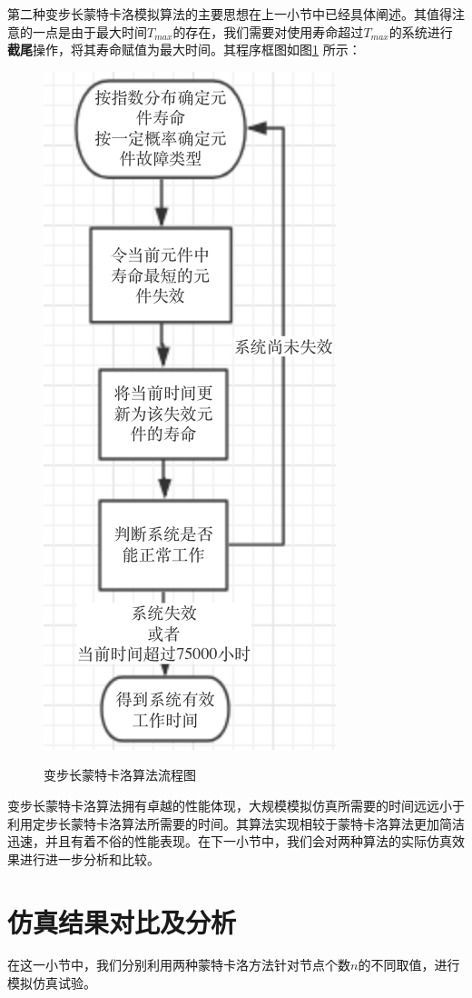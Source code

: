 \documentclass[10.5pt,twocolumn]{jbuaa}
\begin{document}
第二种变步长蒙特卡洛模拟算法的主要思想在上一小节中已经具体阐述。其值得注意的一点是由于最大时间$T_{max}$的存在，我们需要对使用寿命超过$T_{max}$的系统进行\textbf{截尾}操作，将其寿命赋值为最大时间。其程序框图如图\ref{fig:3} 所示：

\begin{figure}[H]
	\centering
	\includegraphics{fig3}
	\label{fig:3}
	\caption{变步长蒙特卡洛算法流程图}
\end{figure}

变步长蒙特卡洛算法拥有卓越的性能体现，大规模模拟仿真所需要的时间远远小于利用定步长蒙特卡洛算法所需要的时间。其算法实现相较于蒙特卡洛算法更加简洁迅速，并且有着不俗的性能表现。在下一小节中，我们会对两种算法的实际仿真效果进行进一步分析和比较。
\section{仿真结果对比及分析}
在这一小节中，我们分别利用两种蒙特卡洛方法针对节点个数$n$的不同取值，进行模拟仿真试验。
\end{document}
